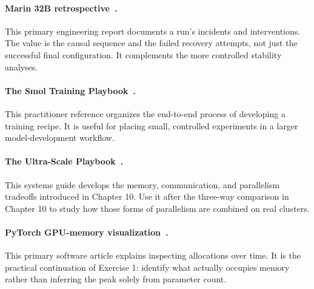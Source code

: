 \paragraph{Marin 32B retrospective~\cite{marinspikes}.}
This primary engineering report documents a run's incidents and interventions. The value is the causal sequence and the failed recovery attempts, not just the successful final configuration. It complements the more controlled stability analyses.

\paragraph{The Smol Training Playbook~\cite{smol}.}
This practitioner reference organizes the end-to-end process of developing a training recipe. It is useful for placing small, controlled experiments in a larger model-development workflow.

\paragraph{The Ultra-Scale Playbook~\cite{ultrascale}.}
This systems guide develops the memory, communication, and parallelism tradeoffs introduced in Chapter 10. Use it after the three-way comparison in Chapter 10 to study how those forms of parallelism are combined on real clusters.

\paragraph{PyTorch GPU-memory visualization~\cite{pytorchmem}.}
This primary software article explains inspecting allocations over time. It is the practical continuation of Exercise 1: identify what actually occupies memory rather than inferring the peak solely from parameter count.

